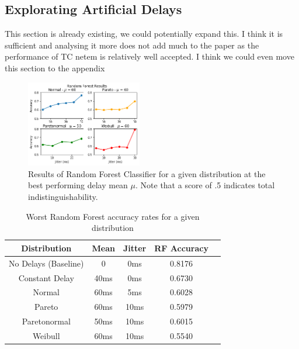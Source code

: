 \documentclass[sigconf]{acmart}
\begin{document}
 



\subsection{Explorating Artificial Delays}

This section is already existing, we could potentially expand this. I think it is sufficient and analysing it more does not add much to the paper as the performance of TC netem is relatively well accepted. I think we could even move this section to the appendix

\begin{figure}
\captionsetup{justification=centering}
\centering
\includegraphics[width=0.45\textwidth]{images/1-plot_exp1.png}
\caption{Results of Random Forest Classifier for a given distribution at the best performing delay mean $\mu$. Note that a score of .5 indicates total indistinguishability.}
\label{Fig:rf_graph}
\end{figure}



\begin{table}[ht!]
\begin{center}
\begin{small}
\begin{sc}
\begin{tabular}{ccccc}
\hline
Distribution & Mean & Jitter & RF Accuracy\\
\hline
No Delays (Baseline) & 0 & 0ms & 0.8176 \\
Constant Delay & 40ms & 0ms & 0.6730 \\
Normal & 60ms & 5ms & 0.6028 \\
Pareto & 60ms & 10ms & 0.5979 \\
Paretonormal & 50ms & 10ms & 0.6015 \\
Weibull & 60ms & 10ms & 0.5540 \\
\hline
\end{tabular}
\end{sc}
\end{small}
\caption{Worst Random Forest accuracy rates for a given distribution}
\label{tab:results-iat_rf}
\end{center}
\vskip -4mm
\end{table}
\end{document}

